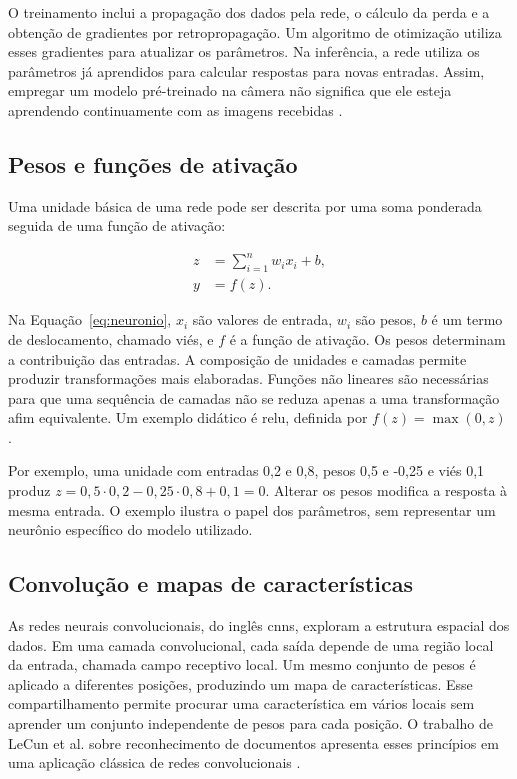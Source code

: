 O treinamento inclui a propagação dos dados pela rede, o cálculo da perda e a obtenção de gradientes por retropropagação. Um algoritmo de otimização utiliza esses gradientes para atualizar os parâmetros. Na inferência, a rede utiliza os parâmetros já aprendidos para calcular respostas para novas entradas. Assim, empregar um modelo pré-treinado na câmera não significa que ele esteja aprendendo continuamente com as imagens recebidas \cite{lecun-2015}.

\subsection{Pesos e funções de ativação}
\label{subsec:pesos-ativacoes}

Uma unidade básica de uma rede pode ser descrita por uma soma ponderada seguida de uma função de ativação:

\begin{equation}
    \label{eq:neuronio}
    \begin{aligned}
        z &= \sum_{i=1}^{n} w_i x_i + b, \\
        y &= f(z).
    \end{aligned}
\end{equation}

Na Equação~\ref{eq:neuronio}, \(x_i\) são valores de entrada, \(w_i\) são pesos, \(b\) é um termo de deslocamento, chamado viés, e \(f\) é a função de ativação. Os pesos determinam a contribuição das entradas. A composição de unidades e camadas permite produzir transformações mais elaboradas. Funções não lineares são necessárias para que uma sequência de camadas não se reduza apenas a uma transformação afim equivalente. Um exemplo didático é \gls{relu}, definida por \(f(z)=\max(0,z)\) \cite{stanford-neuron}.

Por exemplo, uma unidade com entradas 0,2 e 0,8, pesos 0,5 e -0,25 e viés 0,1 produz \(z=0{,}5\cdot 0{,}2-0{,}25\cdot 0{,}8+0{,}1=0\). Alterar os pesos modifica a resposta à mesma entrada. O exemplo ilustra o papel dos parâmetros, sem representar um neurônio específico do modelo utilizado.

\subsection{Convolução e mapas de características}
\label{subsec:convolucao-caracteristicas}

As redes neurais convolucionais, do inglês \glspl{cnn}, exploram a estrutura espacial dos dados. Em uma camada convolucional, cada saída depende de uma região local da entrada, chamada campo receptivo local. Um mesmo conjunto de pesos é aplicado a diferentes posições, produzindo um mapa de características. Esse compartilhamento permite procurar uma característica em vários locais sem aprender um conjunto independente de pesos para cada posição. O trabalho de LeCun et al. sobre reconhecimento de documentos apresenta esses princípios em uma aplicação clássica de redes convolucionais \cite{lecun-1998}.


